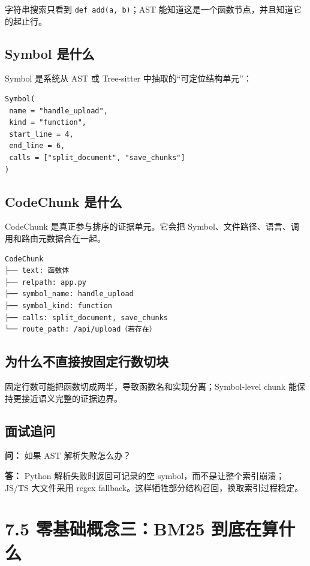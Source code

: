 \documentclass[UTF8,12pt,openany]{ctexbook}
\begin{document}
字符串搜索只看到 \texttt{def add(a, b)}；AST 能知道这是一个函数节点，并且知道它的起止行。\par

\subsection{Symbol 是什么}

Symbol 是系统从 AST 或 Tree-sitter 中抽取的“可定位结构单元”：\par

\begin{lstlisting}
Symbol(
 name = "handle_upload",
 kind = "function",
 start_line = 4,
 end_line = 6,
 calls = ["split_document", "save_chunks"]
)
\end{lstlisting}

\subsection{CodeChunk 是什么}

CodeChunk 是真正参与排序的证据单元。它会把 Symbol、文件路径、语言、调用和路由元数据合在一起。\par

\begin{lstlisting}
CodeChunk
├── text: 函数体
├── relpath: app.py
├── symbol_name: handle_upload
├── symbol_kind: function
├── calls: split_document, save_chunks
└── route_path: /api/upload（若存在）
\end{lstlisting}

\subsection{为什么不直接按固定行数切块}

固定行数可能把函数切成两半，导致函数名和实现分离；Symbol-level chunk 能保持更接近语义完整的证据边界。\par

\subsection{面试追问}

\textbf{问：} 如果 AST 解析失败怎么办？\par

\textbf{答：} Python 解析失败时返回可记录的空 symbol，而不是让整个索引崩溃；JS/TS 大文件采用 regex fallback。这样牺牲部分结构召回，换取索引过程稳定。\par

\section{7.5 零基础概念三：BM25 到底在算什么}
\end{document}
